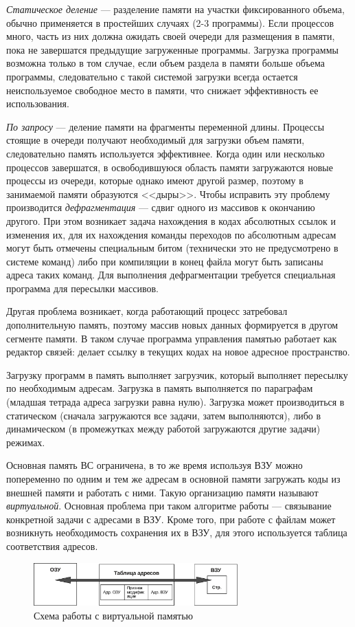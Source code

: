 \documentclass[unicode, 12pt, a4paper, oneside]{article}
\begin{document}
\textit{Статическое деление} --- разделение памяти на участки фиксированного объема, обычно применяется в простейших случаях (2-3 программы). Если процессов много, часть из них должна ожидать своей очереди для размещения в памяти, пока не завершатся предыдущие загруженные программы. Загрузка программы возможна только в том случае, если объем раздела в памяти больше объема программы, следовательно с такой системой загрузки всегда остается неиспользуемое свободное место в памяти, что снижает эффективность ее использования.

\textit{По запросу} --- деление памяти на фрагменты переменной длины. Процессы стоящие в очереди получают необходимый для загрузки объем памяти, следовательно память используется эффективнее. Когда один или несколько процессов завершатся, в освободившуюся область памяти загружаются новые процессы из очереди, которые однако имеют другой размер, поэтому в занимаемой памяти образуются <<дыры>>. Чтобы исправить эту проблему производится \textit{дефрагментация} --- сдвиг одного из массивов к окончанию другого. При этом возникает задача нахождения в кодах абсолютных ссылок и изменения их, для их нахождения команды переходов по абсолютным адресам могут быть отмечены специальным битом (технически это не предусмотрено в системе команд) либо при компиляции в конец файла могут быть записаны адреса таких команд. Для выполнения дефрагментации требуется специальная программа для пересылки массивов.

Другая проблема возникает, когда работающий процесс затребовал дополнительную память, поэтому массив новых данных формируется в другом сегменте памяти. В таком случае программа управления памятью работает как редактор связей: делает ссылку в текущих кодах на новое адресное пространство.

Загрузку программ в память выполняет загрузчик, который выполняет пересылку по необходимым адресам. Загрузка в память выполняется по параграфам (младшая тетрада адреса загрузки равна нулю). Загрузка может производиться в статическом (сначала загружаются все задачи, затем выполняются), либо в динамическом (в промежутках между работой загружаются другие задачи) режимах.

Основная память ВС ограничена, в то же время используя ВЗУ можно попеременно по одним и тем же адресам в основной памяти загружать коды из внешней памяти и работать с ними. Такую организацию памяти называют \textit{виртуальной}. Основная проблема при таком алгоритме работы — связывание конкретной задачи с адресами в ВЗУ. Кроме того, при работе с файлам может возникнуть необходимость сохранения их в ВЗУ, для этого используется таблица соответствия адресов.

\begin{figure}[H]
\centering
\includegraphics[width=0.7\textwidth]{160_virtual_memory.pdf}
\caption{Схема работы с виртуальной памятью}
\end{figure}
\end{document}
